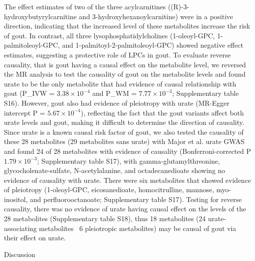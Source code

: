 \documentclass[a4paper,10pt]{article}
\begin{document}
The effect estimates of two of the three acylcarnitines ((R)-3-hydroxy\-butyryl\-carnitine and 3-hydroxy\-hexanoyl\-carnitine) were in a positive direction, indicating that the increased level of these metabolites increase the risk of gout.
In contrast, all three lysophosphatidylcholines (1-oleoyl-GPC, 1-palmitoleoyl-GPC, and 1-palmitoyl-2-palmitoleoyl-GPC) showed negative effect estimates, suggesting a protective role of LPCs in gout.
To evaluate reverse causality, that is gout having a causal effect on the metabolite level, we reversed the MR analysis to test the causality of gout on the metabolite levels and found urate to be the only metabolite that had evidence of causal relationship with gout (P_{IVW} = $3.38\times10^{-4}$ and P_{WM} = $7.77\times10^{-3}$; Supplementary table S16).
However, gout also had evidence of pleiotropy with urate (MR-Egger intercept P = $5.67\times10^{-4}$), reflecting the fact that the gout variants affect both urate levels and gout, making it difficult to determine the direction of causality.
Since urate is a known causal risk factor of gout, we also tested the causality of these 28 metabolites (29 metabolites sans urate) with Major et al.\citep{major_genome-wide_2024} urate GWAS and found 24 of 28 metabolites with evidence of causality (Bonferroni-corrected P \le $1.79\times10^{-3}$; Supplementary table S17), with gamma-glutamylthreonine, glycocholenate-sulfate, N-acetylalanine, and octadecanedioate showing no evidence of causality with urate.
There were six metabolites that showed evidence of pleiotropy (1-oleoyl-GPC, eicosanedioate, homocitrulline, mannose, myo-inositol, and perfluorooctanoate; Supplementary table S17).
Testing for reverse causality, there was no evidence of urate having causal effect on the levels of the 28 metabolites (Supplementary table S18), thus 18 metabolites (24 urate-associating metabolites \textminus\ 6 pleiotropic metabolites) may be causal of gout via their effect on urate.
\\


\begin{center}
	\large{Discussion}
\end{center}
\end{document}
